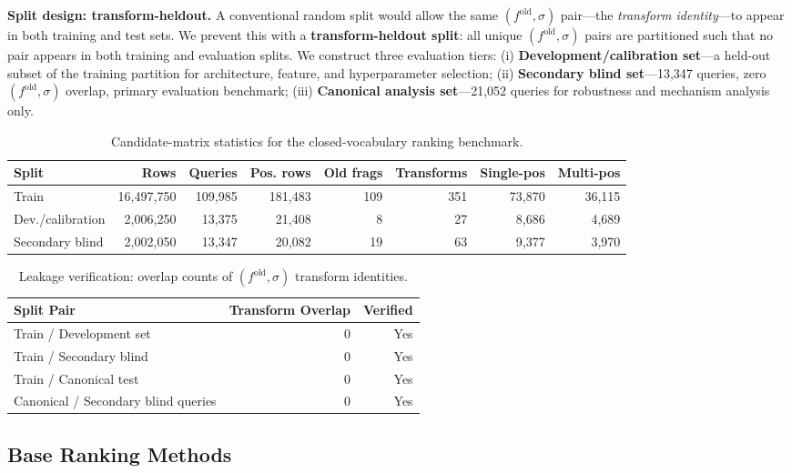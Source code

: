 \documentclass[12pt,letterpaper]{article}
\begin{document}
\textbf{Split design: transform-heldout.}
A conventional random split would allow the same $(f^{\mathrm{old}}, \sigma)$ pair---the \emph{transform identity}---to appear in both training and test sets. We prevent this with a \textbf{transform-heldout split}: all unique $(f^{\mathrm{old}}, \sigma)$ pairs are partitioned such that no pair appears in both training and evaluation splits. We construct three evaluation tiers: (i) \textbf{Development/calibration set}---a held-out subset of the training partition for architecture, feature, and hyperparameter selection; (ii) \textbf{Secondary blind set}---13,347 queries, zero $(f^{\mathrm{old}}, \sigma)$ overlap, primary evaluation benchmark; (iii) \textbf{Canonical analysis set}---21,052 queries for robustness and mechanism analysis only.

\begin{table}[ht]
\centering
\caption{Candidate-matrix statistics for the closed-vocabulary ranking benchmark.}
\label{tab:M1}
\begin{tabular}{lrrrrrrr}
\toprule
Split & Rows & Queries & Pos. rows & Old frags & Transforms & Single-pos & Multi-pos \\
\midrule
Train & 16,497,750 & 109,985 & 181,483 & 109 & 351 & 73,870 & 36,115 \\
Dev./calibration & 2,006,250 & 13,375 & 21,408 & 8 & 27 & 8,686 & 4,689 \\
Secondary blind & 2,002,050 & 13,347 & 20,082 & 19 & 63 & 9,377 & 3,970 \\
\bottomrule
\end{tabular}
\end{table}

\begin{table}[ht]
\centering
\caption{Leakage verification: overlap counts of $(f^{\mathrm{old}}, \sigma)$ transform identities.}
\label{tab:M2}
\begin{tabular}{lrr}
\toprule
Split Pair & Transform Overlap & Verified \\
\midrule
Train / Development set & 0 & Yes \\
Train / Secondary blind & 0 & Yes \\
Train / Canonical test & 0 & Yes \\
Canonical / Secondary blind queries & 0 & Yes \\
\bottomrule
\end{tabular}
\end{table}

\subsection{Base Ranking Methods}
\end{document}
